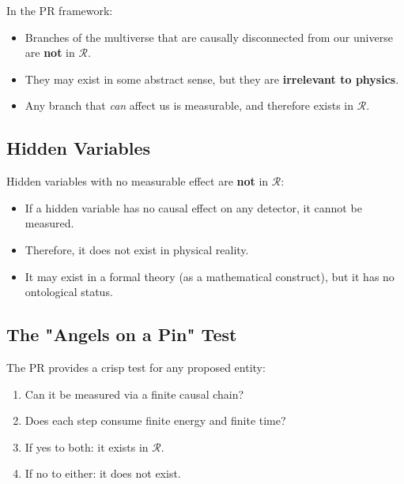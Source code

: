 \documentclass[aps,preprint,showpacs,showkeys]{revtex4}%
\begin{document}
In the PR framework:

\begin{itemize}
\item Branches of the multiverse that are causally disconnected from our
universe are \textbf{not} in $\mathcal{R}$.

\item They may exist in some abstract sense, but they are \textbf{irrelevant
to physics}.

\item Any branch that \emph{can} affect us is measurable, and therefore
exists in $\mathcal{R}$.
\end{itemize}

\subsection{Hidden Variables}

Hidden variables with no measurable effect are \textbf{not} in $\mathcal{R}$:

\begin{itemize}
\item If a hidden variable has no causal effect on any detector, it cannot
be measured.

\item Therefore, it does not exist in physical reality.

\item It may exist in a formal theory (as a mathematical construct), but it
has no ontological status.
\end{itemize}

\subsection{The "Angels on a Pin" Test}

The PR provides a crisp test for any proposed entity:

\begin{enumerate}
\item Can it be measured via a finite causal chain?

\item Does each step consume finite energy and finite time?

\item If yes to both: it exists in $\mathcal{R}$.

\item If no to either: it does not exist.
\end{enumerate}
\end{document}
